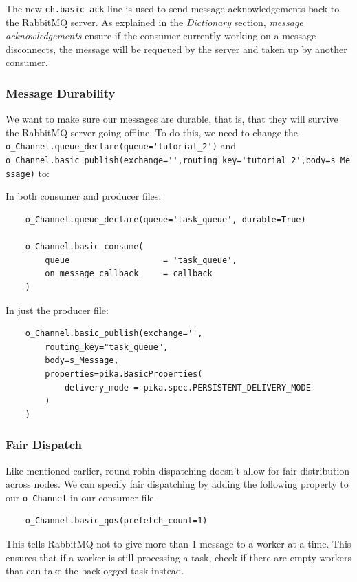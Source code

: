 \documentclass{article}
\begin{document}
The new \verb|ch.basic_ack| line is used to send message acknowledgements back to the RabbitMQ server. As explained in the \textit{Dictionary} section, \textit{message acknowledgements} ensure if the consumer currently working on a message disconnects, the message will be requeued by the server and taken up by another consumer.

\subsubsection{Message Durability}

We want to make sure our messages are durable, that is, that they will survive the RabbitMQ server going offline. To do this, we need to change the \verb|o_Channel.queue_declare(queue='tutorial_2')| and \verb|o_Channel.basic_publish(exchange='',routing_key='tutorial_2',body=s_Message)| to:

In both consumer and producer files:

\begin{verbatim}
    o_Channel.queue_declare(queue='task_queue', durable=True)
    
    o_Channel.basic_consume(
        queue                   = 'task_queue',
        on_message_callback     = callback
    )
\end{verbatim}


In just the producer file:

\begin{verbatim}
    o_Channel.basic_publish(exchange='',
        routing_key="task_queue",
        body=s_Message,
        properties=pika.BasicProperties(
            delivery_mode = pika.spec.PERSISTENT_DELIVERY_MODE
        )
    )
\end{verbatim}

\subsubsection{Fair Dispatch}

Like mentioned earlier, round robin dispatching doesn't allow for fair distribution across nodes. We can specify fair dispatching by adding the following property to our \verb|o_Channel| in our consumer file.

\begin{verbatim}
    o_Channel.basic_qos(prefetch_count=1)
\end{verbatim}

This tells RabbitMQ not to give more than 1 message to a worker at a time. This ensures that if a worker is still processing a task, check if there are empty workers that can take the backlogged task instead.
\end{document}
